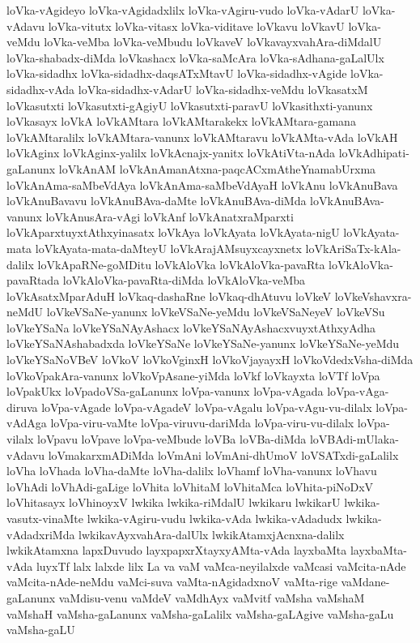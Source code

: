 {loVka-vAgideyo
loVka-vAgidadxlilx
loVka-vAgiru-vudo
loVka-vAdarU
loVka-vAdavu
loVka-vitutx
loVka-vitasx
loVka-viditave
loVkavu
loVkavU
loVka-veMdu
loVka-veMba
loVka-veMbudu
loVkaveV
loVkavayxvahAra-diMdalU
loVka-shabadx-diMda
loVkashacx
loVka-saMcAra
loVka-sAdhana-gaLalUlx
loVka-sidadhx
loVka-sidadhx-daqsATxMtavU
loVka-sidadhx-vAgide
loVka-sidadhx-vAda
loVka-sidadhx-vAdarU
loVka-sidadhx-veMdu
loVkasatxM
loVkasutxti
loVkasutxti-gAgiyU
loVkasutxti-paravU
loVkasithxti-yanunx
loVkasayx
loVkA
loVkAMtara
loVkAMtarakekx
loVkAMtara-gamana
loVkAMtaralilx
loVkAMtara-vanunx
loVkAMtaravu
loVkAMta-vAda
loVkAH
loVkAginx
loVkAginx-yalilx
loVkAcnajx-yanitx
loVkAtiVta-nAda
loVkAdhipati-gaLanunx
loVkAnAM
loVkAnAmanAtxna-paqcACxmAtheYnamabUrxma
loVkAnAma-saMbeVdAya
loVkAnAma-saMbeVdAyaH
loVkAnu
loVkAnuBava
loVkAnuBavavu
loVkAnuBAva-daMte
loVkAnuBAva-diMda
loVkAnuBAva-vanunx
loVkAnusAra-vAgi
loVkAnf
loVkAnatxraMparxti
loVkAparxtuyxtAthxyinasatx
loVkAya
loVkAyata
loVkAyata-nigU
loVkAyata-mata
loVkAyata-mata-daMteyU
loVkArajAMsuyxcayxnetx
loVkAriSaTx-kAla-dalilx
loVkApaRNe-goMDitu
loVkAloVka
loVkAloVka-pavaRta
loVkAloVka-pavaRtada
loVkAloVka-pavaRta-diMda
loVkAloVka-veMba
loVkAsatxMparAduH
loVkaq-dashaRne
loVkaq-dhAtuvu
loVkeV
loVkeVshavxra-neMdU
loVkeVSaNe-yanunx
loVkeVSaNe-yeMdu
loVkeVSaNeyeV
loVkeVSu
loVkeYSaNa
loVkeYSaNAyAshacx
loVkeYSaNAyAshacxvuyxtAthxyAdha
loVkeYSaNAshabadxda
loVkeYSaNe
loVkeYSaNe-yanunx
loVkeYSaNe-yeMdu
loVkeYSaNoVBeV
loVkoV
loVkoVginxH
loVkoVjayayxH
loVkoVdedxVsha-diMda
loVkoVpakAra-vanunx
loVkoVpAsane-yiMda
loVkf
loVkayxta
loVTf
loVpa
loVpakUkx
loVpadoVSa-gaLanunx
loVpa-vanunx
loVpa-vAgada
loVpa-vAga-diruva
loVpa-vAgade
loVpa-vAgadeV
loVpa-vAgalu
loVpa-vAgu-vu-dilalx
loVpa-vAdAga
loVpa-viru-vaMte
loVpa-viruvu-dariMda
loVpa-viru-vu-dilalx
loVpa-vilalx
loVpavu
loVpave
loVpa-veMbude
loVBa
loVBa-diMda
loVBAdi-mUlaka-vAdavu
loVmakarxmADiMda
loVmAni
loVmAni-dhUmoV
loVSATxdi-gaLalilx
loVha
loVhada
loVha-daMte
loVha-dalilx
loVhamf
loVha-vanunx
loVhavu
loVhAdi
loVhAdi-gaLige
loVhita
loVhitaM
loVhitaMca
loVhita-piNoDxV
loVhitasayx
loVhinoyxV
lwkika
lwkika-riMdalU
lwkikaru
lwkikarU
lwkika-vasutx-vinaMte
lwkika-vAgiru-vudu
lwkika-vAda
lwkika-vAdadudx
lwkika-vAdadxriMda
lwkikavAyxvahAra-dalUlx
lwkikAtamxjAcnxna-dalilx
lwkikAtamxna
lapxDuvudo
layxpapxrXtayxyAMta-vAda
layxbaMta
layxbaMta-vAda
luyxTf
lalx
lalxde
lilx
La
va
vaM
vaMca-neyilalxde
vaMcasi
vaMcita-nAde
vaMcita-nAde-neMdu
vaMci-suva
vaMta-nAgidadxnoV
vaMta-rige
vaMdane-gaLanunx
vaMdisu-venu
vaMdeV
vaMdhAyx
vaMvitf
vaMsha
vaMshaM
vaMshaH
vaMsha-gaLanunx
vaMsha-gaLalilx
vaMsha-gaLAgive
vaMsha-gaLu
vaMsha-gaLU
}
